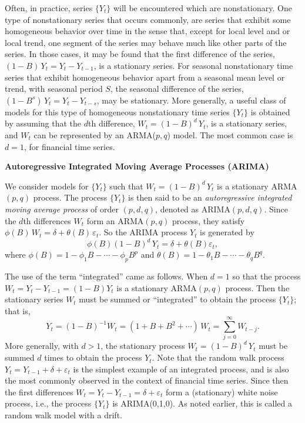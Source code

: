 Often, in practice, series $\{ Y_t \}$ will be encountered which are nonstationary. One type of nonstationary series that occurs commonly, are series that exhibit some homogeneous behavior over time in the sense that, except for local level and or local trend, one segment of the series may behave much like other parts of the series. In those cases, it may be found that the first difference of the series, $(1 - B)\, Y_t = Y_t - Y_{t-1}$, is a stationary series. For seasonal nonstationary time series that exhibit homogeneous behavior apart from a seasonal mean level or trend, with seasonal period $S$, the seasonal difference of the series, $(1 - B^s)\, Y_t = Y_t - Y_{t-s}$, may be stationary. More generally, a useful class of models for this type of homogeneous nonstationary time series $\{Y_t\}$ is obtained by assuming that the $d$th difference, $W_t = (1 - B)^d\,Y_t$, is a stationary series, and $W_t$ can be represented by an ARMA($p,q$) model. The most common case is $d=1$, for financial time series. \twomedskip


\noindent\textbf{Autoregressive Integrated Moving Average Processes (ARIMA)} \twomedskip


We consider models for $\{ Y_t \}$ such that $W_t = (1 - B)^d\, Y_t$ is a stationary ARMA$(p,q)$ process. The process $\{ Y_t \}$ is then said to be an \emph{autoregressive integrated moving average process} of order $(p,d,q)$, denoted as ARIMA$(p,d,q)$. Since the $d$th differences $W_t$ form an ARMA$(p,q)$ process, they satisfy $\phi(B)\, W_t = \delta + \theta(B)\, \varepsilon_t$. So the ARIMA process $Y_t$ is generated by 
	\begin{equation} \label{eqn:phiBdy}
	\phi(B)(1 - B)^d\, Y_t = \delta + \theta(B)\varepsilon_t,
	\end{equation}
where $\phi(B) = 1 - \phi_1 B - \cdots - \phi_p B^p$ and $\theta(B) = 1 - \theta_1 B - \cdots - \theta_q B^q$.


The use of the term ``integrated'' came as follows. When $d=1$ so that the process $W_t = Y_t - Y_{t-1}= (1-B)Y_t$ is a stationary ARMA$(p,q)$ process. Then the stationary series $W_t$ must be summed or ``integrated'' to obtain the process $\{Y_t\}$; that is,
	\[
	Y_t = (1 - B)^{-1}W_t = (1 + B + B^2 + \cdots)\, W_t = \sum_{j=0}^\infty W_{t-j}. 
	\]
More generally, with $d > 1$, the stationary process $W_t = (1 - B)^d\, Y_t$ must be summed $d$ times to obtain the process $Y_t$. Note that the random walk process $Y_t = Y_{t-1} + \delta + \varepsilon_t$ is the simplest example of an integrated process, and is also the most commonly observed in the context of financial time series. Since then the first differences $W_t = Y_t - Y_{t-1} = \delta + \varepsilon_t$ form a (stationary) white noise process, i.e., the process $\{ Y_t \}$ is ARIMA(0,1,0). As noted earlier, this is called a random walk model with a drift.



